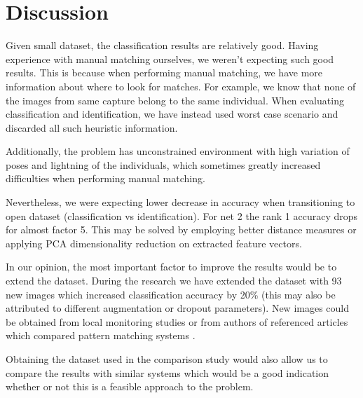 \documentclass[fleqn,moreauthors,10pt]{ds_report}
\begin{document}
\section*{Discussion}

Given small dataset, the classification results are relatively good. Having experience with manual matching ourselves, we weren't expecting such good results. This is because when performing manual matching, we have more information about where to look for matches. For example, we know that none of the images from same capture belong to the same individual. When evaluating classification and identification, we have instead used worst case scenario and discarded all such heuristic information.

Additionally, the problem has unconstrained environment with high variation of poses and lightning of the individuals, which sometimes greatly increased difficulties when performing manual matching.

Nevertheless, we were expecting lower decrease in accuracy when transitioning to open dataset (classification vs identification). For net 2 the rank 1 accuracy drops for almost factor 5. This may be solved by employing better distance measures or applying PCA dimensionality reduction on extracted feature vectors.

In our opinion, the most important factor to improve the results would be to extend the dataset. During the research we have extended the dataset with 93 new images which increased classification accuracy by 20\% (this may also be attributed to different augmentation or dropout parameters). New images could be obtained from local monitoring studies or from authors of referenced articles which compared pattern matching systems \cite{ident_comparison}.

Obtaining the dataset used in the comparison study would also allow us to compare the results with similar systems which would be a good indication whether or not this is a feasible approach to the problem.



\end{document}
